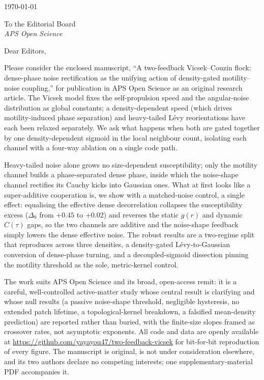 \documentclass[11pt,a4paper]{article}
\begin{document}
\hfill\today

\medskip

To the Editorial Board\\
\emph{APS Open Science}

\medskip

Dear Editors,

Please consider the enclosed manuscript, ``A two-feedback
Vicsek--Couzin flock: dense-phase noise rectification as the
unifying action of density-gated motility--noise coupling,'' for
publication in APS Open Science as an original research
article. The Vicsek model fixes the self-propulsion speed and the
angular-noise distribution as global constants; a density-dependent
speed (which drives motility-induced phase separation) and
heavy-tailed L\'evy reorientations have each been relaxed
separately. We ask what happens when both are gated together by one
density-dependent sigmoid in the local neighbour count, isolating
each channel with a four-way ablation on a single code path.

Heavy-tailed noise alone grows no size-dependent susceptibility;
only the motility channel builds a phase-separated dense phase,
inside which the noise-shape channel rectifies its Cauchy kicks
into Gaussian ones. What at first looks like a super-additive
cooperation is, we show with a matched-noise control, a single
effect: equalising the effective dense decorrelation collapses the
susceptibility excess ($\Delta_9$ from $+0.45$ to $+0.02$) and
reverses the static $g(r)$ and dynamic $C(\tau)$ gaps, so the two
channels are additive and the noise-shape feedback simply lowers
the dense effective noise. The robust results are a two-regime
split that reproduces across three densities, a density-gated
L\'evy-to-Gaussian conversion of dense-phase turning, and a
decoupled-sigmoid dissection pinning the motility threshold as the
sole, metric-kernel control.

The work suits APS Open Science and its broad, open-access
remit: it is a careful, well-controlled active-matter study whose
central result is clarifying and whose null results (a passive
noise-shape threshold, negligible hysteresis, no extended patch
lifetime, a topological-kernel breakdown, a falsified mean-density
prediction) are reported rather than buried, with the finite-size
slopes framed as crossover rates, not asymptotic exponents. All
code and data are openly available at
\url{https://github.com/yayayou47/two-feedback-vicsek} for
bit-for-bit reproduction of every figure. The manuscript is
original, is not under consideration elsewhere, and its two authors
declare no competing interests; one supplementary-material PDF
accompanies it.
\end{document}
